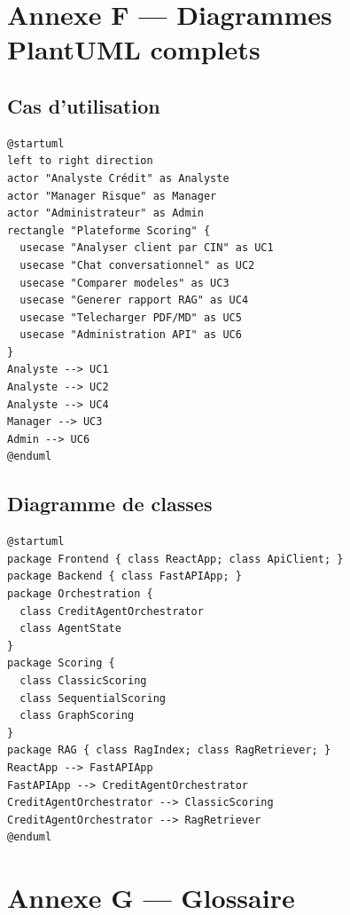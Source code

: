 \chapter{Annexe F — Diagrammes PlantUML complets}
\label{ann:plantuml}

\section{Cas d'utilisation}

\begin{lstlisting}[language={},caption={PlantUML Use Case}]
@startuml
left to right direction
actor "Analyste Crédit" as Analyste
actor "Manager Risque" as Manager
actor "Administrateur" as Admin
rectangle "Plateforme Scoring" {
  usecase "Analyser client par CIN" as UC1
  usecase "Chat conversationnel" as UC2
  usecase "Comparer modeles" as UC3
  usecase "Generer rapport RAG" as UC4
  usecase "Telecharger PDF/MD" as UC5
  usecase "Administration API" as UC6
}
Analyste --> UC1
Analyste --> UC2
Analyste --> UC4
Manager --> UC3
Admin --> UC6
@enduml
\end{lstlisting}

\section{Diagramme de classes}

\begin{lstlisting}[language={},caption={PlantUML Class Diagram}]
@startuml
package Frontend { class ReactApp; class ApiClient; }
package Backend { class FastAPIApp; }
package Orchestration {
  class CreditAgentOrchestrator
  class AgentState
}
package Scoring {
  class ClassicScoring
  class SequentialScoring
  class GraphScoring
}
package RAG { class RagIndex; class RagRetriever; }
ReactApp --> FastAPIApp
FastAPIApp --> CreditAgentOrchestrator
CreditAgentOrchestrator --> ClassicScoring
CreditAgentOrchestrator --> RagRetriever
@enduml
\end{lstlisting}

\chapter{Annexe G — Glossaire}
\label{ann:glossaire}


